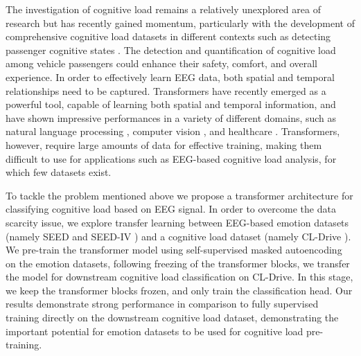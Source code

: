 \documentclass[sigconf]{acmart}
\begin{document}
The investigation of cognitive load remains a relatively unexplored area of research but has recently gained momentum, particularly with the development of comprehensive cognitive load datasets in different contexts such as detecting passenger cognitive states \cite{angkan2023multimodal}. The detection and quantification of cognitive load among vehicle passengers could enhance their safety, comfort, and overall experience. In order to effectively learn EEG data, both spatial and temporal relationships need to be captured. Transformers \cite{vaswani2017attention} have recently emerged as a powerful tool, capable of learning both spatial and temporal information, and have shown impressive performances in a variety of different domains, such as natural language processing \cite{devlin2018bert}, computer vision \cite{dosovitskiy2020image}, and healthcare \cite{gupta2017towards}. Transformers, however, require large amounts of data for effective training, making them difficult to use for applications such as EEG-based cognitive load analysis, for which few datasets exist. 


To tackle the problem mentioned above we propose a transformer architecture for classifying cognitive load based on EEG signal. In order to overcome the data scarcity issue, we explore transfer learning between EEG-based emotion datasets (namely SEED \cite{duan2013differential, zheng2015investigating} and SEED-IV \cite{zheng2018emotionmeter}) and a cognitive load dataset (namely CL-Drive \cite{angkan2023multimodal}). We pre-train the transformer model using self-supervised masked autoencoding on the emotion datasets, following freezing of the transformer blocks, we transfer the model for downstream cognitive load classification on CL-Drive. In this stage, we keep the transformer blocks frozen, and only train the classification head. Our results demonstrate strong performance in comparison to fully supervised training directly on the downstream cognitive load dataset, demonstrating the important potential for emotion datasets to be used for cognitive load pre-training.
\end{document}
